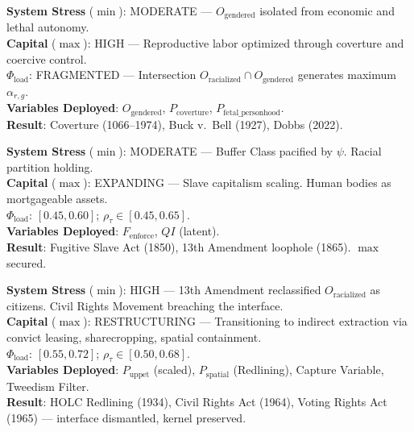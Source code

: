 \documentclass[12pt,openany]{book}
\begin{document}
\begin{tcolorbox}[colback=black!5, colframe=black!70, fonttitle=\bfseries\ttfamily, title=3. RUNTIME LOG: GENDERED AXIS (FOUNDATIONAL--PRESENT) \normalfont\small--- Chapter 4]
\ttfamily\small
\textbf{System Stress} ($\min$): MODERATE --- $O_{\text{gendered}}$ isolated from economic and lethal autonomy.\\
\textbf{Capital} ($\max$): HIGH --- Reproductive labor optimized through coverture and coercive control.\\
\textbf{$\Phi_{\text{load}}$}: FRAGMENTED --- Intersection $O_{\text{racialized}} \cap O_{\text{gendered}}$ generates maximum $\alpha_{r,g}$.\\
\textbf{Variables Deployed}: $O_{\text{gendered}}$, $P_{\text{coverture}}$, $P_{\text{fetal\_personhood}}$.\\
\textbf{Result}: Coverture (1066--1974), Buck v.\ Bell (1927), Dobbs (2022).
\end{tcolorbox}

\begin{tcolorbox}[colback=black!5, colframe=black!70, fonttitle=\bfseries\ttfamily, title=4. RUNTIME LOG: 1704--1865 (AMERICAN SOUTH) \normalfont\small--- Chapter 5]
\ttfamily\small
\textbf{System Stress} ($\min$): MODERATE --- Buffer Class pacified by $\psi$. Racial partition holding.\\
\textbf{Capital} ($\max$): EXPANDING --- Slave capitalism scaling. Human bodies as mortgageable assets.\\
\textbf{$\Phi_{\text{load}}$}: $[0.45, 0.60]$; $\rho_{\tau} \in [0.45, 0.65]$.\\
\textbf{Variables Deployed}: $F_{\text{enforce}}$, $QI$ (latent).\\
\textbf{Result}: Fugitive Slave Act (1850), 13th Amendment loophole (1865). $\max$ secured.
\end{tcolorbox}

\begin{tcolorbox}[colback=black!5, colframe=black!70, fonttitle=\bfseries\ttfamily, title=5. RUNTIME LOG: 1870s--1960s (RECONSTRUCTION $\rightarrow$ CIVIL RIGHTS) \normalfont\small--- Chapter 6]
\ttfamily\small
\textbf{System Stress} ($\min$): HIGH --- 13th Amendment reclassified $O_{\text{racialized}}$ as citizens. Civil Rights Movement breaching the interface.\\
\textbf{Capital} ($\max$): RESTRUCTURING --- Transitioning to indirect extraction via convict leasing, sharecropping, spatial containment.\\
\textbf{$\Phi_{\text{load}}$}: $[0.55, 0.72]$; $\rho_{\tau} \in [0.50, 0.68]$.\\
\textbf{Variables Deployed}: $P_{\text{uppet}}$ (scaled), $P_{\text{spatial}}$ (Redlining), Capture Variable, Tweedism Filter.\\
\textbf{Result}: HOLC Redlining (1934), Civil Rights Act (1964), Voting Rights Act (1965) --- interface dismantled, kernel preserved.
\end{tcolorbox}
\end{document}
